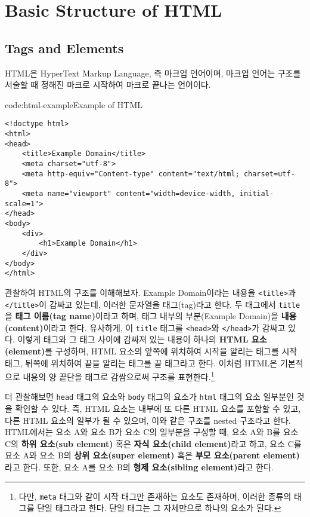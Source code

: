 \section{Basic Structure of HTML} \label{sect:basic-structure-of-html}

\subsection*{Tags and Elements}
HTML은 HyperText Markup Language, 즉 마크업 언어이며, 마크업 언어는 구조를 서술할 때 정해진 마크로 시작하여 마크로 끝나는 언어이다.

\begin{codeenv}{code:html-example}{Example of HTML}\begin{verbatim}
<!doctype html>
<html>
<head>
    <title>Example Domain</title>
    <meta charset="utf-8">
    <meta http-equiv="Content-type" content="text/html; charset=utf-8">
    <meta name="viewport" content="width=device-width, initial-scale=1">
</head>
<body>
    <div>
        <h1>Example Domain</h1>
    </div>
</body>
</html>
\end{verbatim}
\end{codeenv}

\을 관찰하여 HTML의 구조를 이해해보자. Example Domain이라는 내용을 \texttt{<title>}과 \texttt{</title>}이 감싸고 있는데, 이러한 문자열을 태그(tag)라고 한다. 두 태그에서 \texttt{title}을 \textbf{태그 이름(tag name)}이라고 하며, 태그 내부의 부분(Example Domain)을 \textbf{내용(content)}이라고 한다. 유사하게, 이 \texttt{title} 태그를 \texttt{<head>}와 \texttt{</head>}가 감싸고 있다. 이렇게 태그와 그 태그 사이에 감싸져 있는 내용이 하나의 \textbf{HTML 요소(element)}를 구성하며, HTML 요소의 앞쪽에 위치하여 시작을 알리는 태그를 시작 태그, 뒤쪽에 위치하여 끝을 알리는 태그를 끝 태그라고 한다. 이처럼 HTML은 기본적으로 내용의 양 끝단을 태그로 감쌈으로써 구조를 표현한다.\footnote{다만, \texttt{meta} 태그와 같이 시작 태그만 존재하는 요소도 존재하며, 이러한 종류의 태그를 단일 태그라고 한다. 단일 태그는 그 자체만으로 하나의 요소가 된다.}

\을 더 관찰해보면 \texttt{head} 태그의 요소와 \texttt{body} 태그의 요소가 \texttt{html} 태그의 요소 일부분인 것을 확인할 수 있다. 즉, HTML 요소는 내부에 또 다른 HTML 요소를 포함할 수 있고, 다른 HTML 요소의 일부가 될 수 있으며, 이와 같은 구조를 nested 구조라고 한다. HTML에서는 요소 A와 요소 B가 요소 C의 일부분을 구성할 때, 요소 A와 B를 요소 C의 \textbf{하위 요소(sub element)} 혹은 \textbf{자식 요소(child element)}라고 하고, 요소 C를 요소 A와 요소 B의 \textbf{상위 요소(super element)} 혹은 \textbf{부모 요소(parent element)}라고 한다. 또한, 요소 A를 요소 B의 \textbf{형제 요소(sibling element)}라고 한다.


